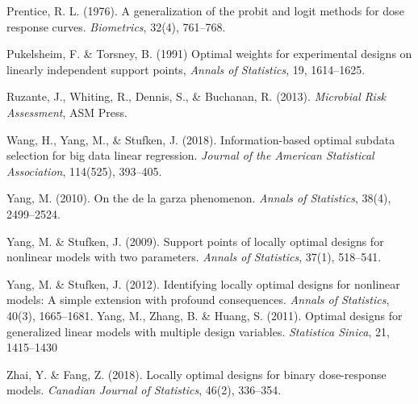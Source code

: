 \documentclass[12pt]{TD-CJS}
\begin{document}
\begin{thebibliography}{}
Prentice, R. L. (1976). A generalization of the probit and logit methods for dose response curves. {\it Biometrics}, 32(4), 761–768.

Pukelsheim, F. \& Torsney, B. (1991) Optimal weights for experimental designs on linearly independent support points, {\it Annals of Statistics}, 19, 1614--1625.



Ruzante, J., Whiting, R., Dennis, S., \& Buchanan, R. (2013). {\it Microbial Risk Assessment}, ASM Press.

Wang, H., Yang, M., \& Stufken, J. (2018). Information-based optimal subdata selection for big data linear regression. {\it Journal of the American Statistical Association}, 114(525), 393--405.

Yang, M. (2010). On the de la garza phenomenon. {\it Annals of Statistics}, 38(4), 2499--2524.

Yang, M. \& Stufken, J. (2009). Support points of locally optimal designs for nonlinear models with two parameters. {\it Annals of Statistics}, 37(1), 518--541.

Yang, M. \& Stufken, J. (2012). Identifying locally optimal designs for nonlinear models: A simple extension with profound consequences. {\it Annals of Statistics}, 40(3), 1665--1681.
Yang, M., Zhang, B. \& Huang, S. (2011). Optimal designs for generalized linear models with multiple design variables. {\it Statistica Sinica}, 21, 1415--1430

Zhai, Y. \& Fang, Z. (2018). Locally optimal designs for binary dose-response models. {\it Canadian Journal of Statistics}, 46(2), 336--354.












\end{thebibliography}






\CJShistory
\end{document}
